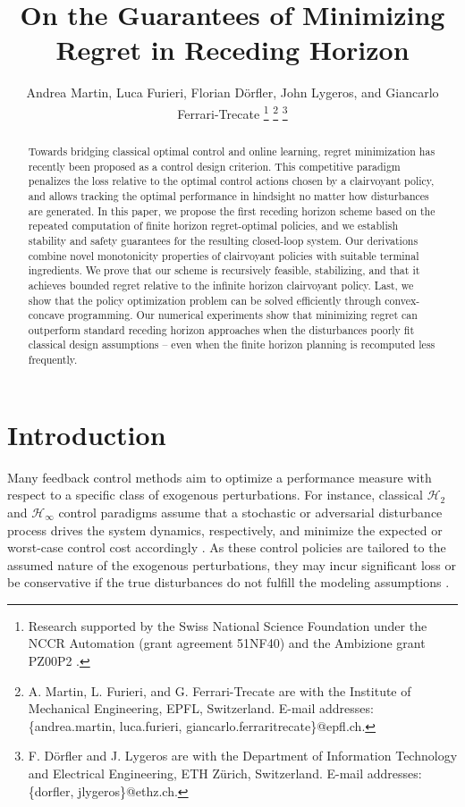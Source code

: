 \documentclass[conference]{IEEEtran}
\begin{document}
\title{\LARGE On the Guarantees of Minimizing Regret in Receding Horizon}

\author{Andrea Martin, Luca Furieri, Florian D\"orfler, John Lygeros, and Giancarlo Ferrari-Trecate
\thanks{Research supported by the Swiss National Science Foundation under the NCCR Automation (grant agreement 51NF40) and the Ambizione grant PZ00P2
.}
\thanks{A. Martin, L. Furieri, and G. Ferrari-Trecate are with the Institute of Mechanical Engineering, EPFL, Switzerland. E-mail addresses: \{andrea.martin, luca.furieri, giancarlo.ferraritrecate\}@epfl.ch.}
\thanks{F. D\"orfler and J. Lygeros are with the Department of Information Technology and Electrical Engineering, ETH Z\"urich, Switzerland. E-mail addresses: \{dorfler, jlygeros\}@ethz.ch.}}

\maketitle

\begin{abstract}
    Towards bridging classical optimal control and online learning, regret minimization has recently been proposed as a control design criterion. This competitive paradigm penalizes the loss relative to the optimal control actions chosen by a clairvoyant policy, and allows tracking the optimal performance in hindsight no matter how disturbances are generated. In this paper, we propose the first receding horizon scheme based on the repeated computation of finite horizon regret-optimal policies, and we establish stability and safety guarantees for the resulting closed-loop system. Our derivations combine novel monotonicity properties of clairvoyant policies with suitable terminal ingredients. We prove that our scheme is recursively feasible, stabilizing, and that it achieves bounded regret relative to the infinite horizon clairvoyant policy. Last, we show that the policy optimization problem can be solved efficiently through convex-concave programming. Our numerical experiments show that minimizing regret can outperform standard receding horizon approaches when the disturbances poorly fit classical design assumptions – even when the finite horizon planning is recomputed less frequently.
\end{abstract}


\section{Introduction}
Many feedback control methods aim to optimize a performance measure with respect to a specific class of exogenous perturbations. For instance, classical $\mathcal{H}_2$ and $\mathcal{H}_\infty$ control paradigms assume that a stochastic or adversarial disturbance process drives the system dynamics, respectively, and minimize the expected or worst-case control cost accordingly \cite{hassibi1999indefinite}. As these control policies are tailored to the assumed nature of the exogenous perturbations, they may incur significant loss or be conservative if the true disturbances do not fulfill the modeling assumptions \cite{goel2022power, karapetyan2022regret}.
\end{document}
